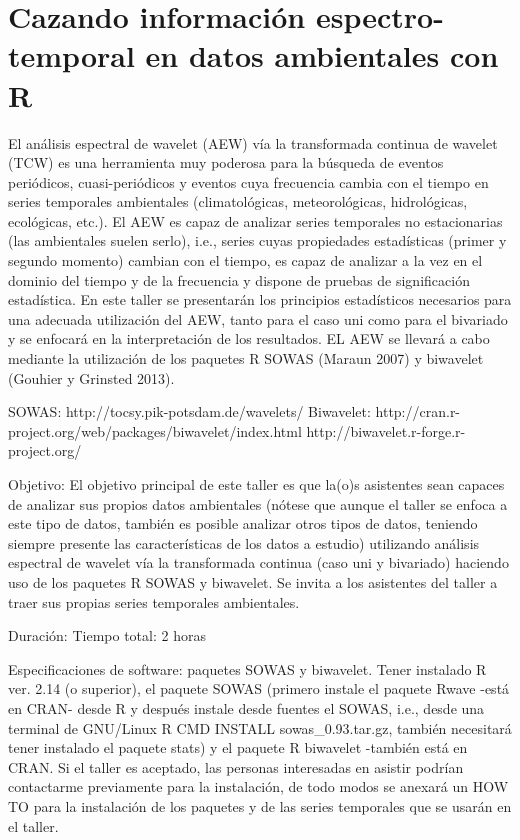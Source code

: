 \chapter{Cazando información espectro-temporal en datos ambientales con R}




El análisis espectral de wavelet (AEW) vía la transformada continua de wavelet (TCW) es una herramienta muy poderosa para la búsqueda  de eventos periódicos, cuasi-periódicos y eventos cuya frecuencia cambia con el tiempo en series temporales ambientales (climatológicas,  meteorológicas, hidrológicas, ecológicas, etc.). El AEW es capaz de analizar series temporales no estacionarias (las ambientales suelen serlo), i.e., series cuyas propiedades estadísticas (primer y segundo momento) cambian con el tiempo, es capaz de analizar a la vez en el dominio del tiempo y de la frecuencia y dispone de pruebas de significación estadística. En este taller se presentarán los principios estadísticos necesarios para una adecuada utilización del AEW, tanto para el caso uni como para el bivariado y se enfocará en la interpretación de los resultados. EL AEW se llevará a cabo mediante la utilización de los paquetes R SOWAS (Maraun 2007) y biwavelet (Gouhier y Grinsted 2013). 

SOWAS: http://tocsy.pik-potsdam.de/wavelets/
Biwavelet: http://cran.r-project.org/web/packages/biwavelet/index.html
http://biwavelet.r-forge.r-project.org/


Objetivo: 
El objetivo principal de este taller es que la(o)s asistentes sean capaces de analizar sus propios datos ambientales (nótese que aunque  el taller se enfoca a este tipo de datos, también es posible analizar  otros tipos de datos, teniendo siempre presente las características de  los datos a estudio) utilizando análisis espectral de wavelet vía la  transformada continua (caso uni y bivariado) haciendo uso de los paquetes R SOWAS y biwavelet. Se invita a los asistentes del taller a traer sus propias series temporales ambientales. 


Duración: 
Tiempo total: 2 horas 

Especificaciones de software: paquetes SOWAS y biwavelet.
Tener instalado R ver. 2.14 (o superior), el paquete SOWAS (primero instale el paquete Rwave -está en CRAN- desde R y después instale desde fuentes el SOWAS, i.e., desde una terminal de GNU/Linux  R CMD INSTALL sowas\_0.93.tar.gz, también necesitará tener instalado el paquete stats) y el paquete R biwavelet -también está en CRAN. Si el taller es aceptado, las personas interesadas en asistir podrían contactarme previamente para la instalación, de todo modos se anexará un HOW TO para la instalación de los paquetes y de las series temporales que se usarán en el taller. 


